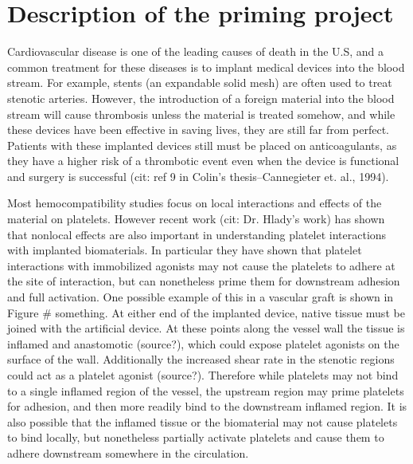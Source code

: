 

\section{Description of the priming project}
\label{sec:priming-project}

Cardiovascular disease is one of the leading causes of death in the
U.S, and a common treatment for these diseases is to implant medical
devices into the blood stream. For example, stents (an expandable
solid mesh) are often used to treat stenotic arteries. However, the
introduction of a foreign material into the blood stream will cause
thrombosis unless the material is treated somehow, and while these
devices have been effective in saving lives, they are still far from
perfect. Patients with these implanted devices still must be placed on
anticoagulants, as they have a higher risk of a thrombotic event even
when the device is functional and surgery is successful (cit: ref 9 in
Colin's thesis--Cannegieter et. al., 1994).
		

Most hemocompatibility studies focus on local interactions and effects
of the material on platelets. However recent work (cit: Dr. Hlady's
work) has shown that nonlocal effects are also important in
understanding platelet interactions with implanted biomaterials. In
particular they have shown that platelet interactions with immobilized
agonists may not cause the platelets to adhere at the site of
interaction, but can nonetheless prime them for downstream adhesion
and full activation. One possible example of this in a vascular graft
is shown in Figure \# something. At either end of the implanted
device, native tissue must be joined with the artificial device. At
these points along the vessel wall the tissue is inflamed and
anastomotic (source?), which could expose platelet agonists on the
surface of the wall. Additionally the increased shear rate in the
stenotic regions could act as a platelet agonist (source?). Therefore
while platelets may not bind to a single inflamed region of the
vessel, the upstream region may prime platelets for adhesion, and then
more readily bind to the downstream inflamed region. It is also
possible that the inflamed tissue or the biomaterial may not cause
platelets to bind locally, but nonetheless partially activate
platelets and cause them to adhere downstream somewhere in the
circulation.
		
